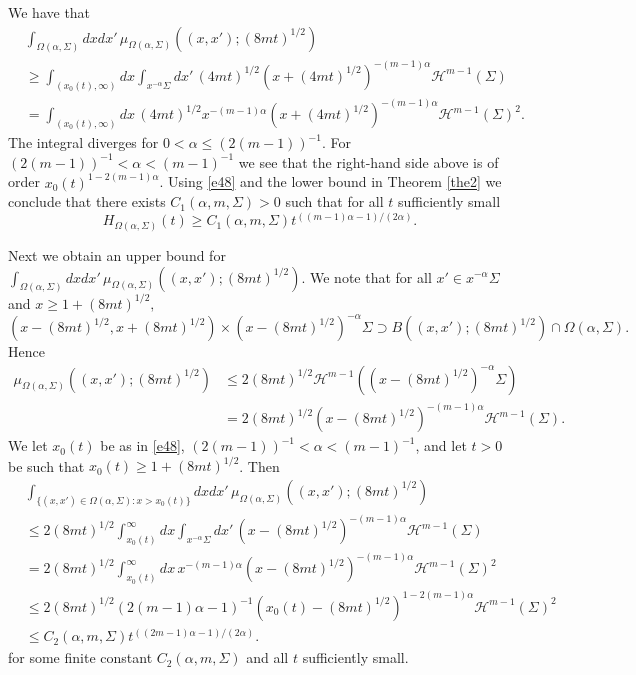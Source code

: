 \documentclass[a4paper,9pt]{amsart}
\begin{document}
We have that
\begin{align*}
&\int_{\Omega(\alpha,\Sigma)}dxdx' \,
\mu_{\Omega(\alpha,\Sigma)}((x,x');(8mt)^{1/2})
\\ &
\ge \int_{(x_0(t),\infty)}dx\int_{x^{-\alpha}\Sigma}
dx' \, (4mt)^{1/2}(x+(4mt)^{1/2})^{-(m-1)\alpha}\mathcal{H}^{m-1}(\Sigma)
\\ &
=\int_{(x_0(t),\infty)}dx \, (4mt)^{1/2}x^{-(m-1)\alpha}(x+(4mt)^{1/2})^{-(m-1)\alpha}\mathcal{H}^{m-1}(\Sigma)^2.
\end{align*}
The integral diverges for $0<\alpha\le (2(m-1))^{-1}$. For
$(2(m-1))^{-1}<\alpha<(m-1)^{-1}$ we see that the right-hand side
above is of order $x_0(t)^{1-2(m-1)\alpha}$. Using \eqref{e48} and
the lower bound in Theorem \ref{the2} we conclude that there
exists $C_1(\alpha,m,\Sigma)>0$ such that for all $t$ sufficiently
small
\begin{equation}\label{e521}
H_{\Omega(\alpha,\Sigma)}(t)\ge
C_1(\alpha,m,\Sigma)t^{((m-1)\alpha-1)/(2\alpha)}.
\end{equation}

Next we obtain an upper bound for
$\int_{\Omega(\alpha,\Sigma)}dxdx' \,
\mu_{\Omega(\alpha,\Sigma)}((x,x');(8mt)^{1/2})$. We note that for
all $x'\in x^{-\alpha}\Sigma$ and $x\ge 1+(8mt)^{1/2},$
\begin{equation*}
(x-(8mt)^{1/2},x+(8mt)^{1/2})\times(x-(8mt)^{1/2})^{-\alpha}\Sigma
\supset B((x,x');(8mt)^{1/2})\cap \Omega(\alpha,\Sigma).
\end{equation*}
Hence
\begin{align*}
\mu_{\Omega(\alpha,\Sigma)}((x,x');(8mt)^{1/2})&\le
2(8mt)^{1/2}\mathcal{H}^{m-1}((x-(8mt)^{1/2})^{-\alpha}\Sigma)\\
&=
2(8mt)^{1/2}(x-(8mt)^{1/2})^{-(m-1)\alpha}\mathcal{H}^{m-1}(\Sigma).
\end{align*}
We let $x_0(t)$ be as in \eqref{e48},
$(2(m-1))^{-1}<\alpha<(m-1)^{-1}$, and let $t>0$ be such that
$x_0(t)\ge 1+(8mt)^{1/2}$. Then
\begin{align}\label{e55}
&\int_{\{(x,x')\in \Omega(\alpha,\Sigma):x>x_0(t)\}}dxdx' \,
\mu_{\Omega(\alpha,\Sigma)}((x,x');(8mt)^{1/2})\nonumber
\\ &
\le2(8mt)^{1/2}\int_{x_0(t)}^{\infty}dx
\int_{x^{-\alpha}\Sigma}dx' \,
(x-(8mt)^{1/2})^{-(m-1)\alpha}\mathcal{H}^{m-1}(\Sigma)\nonumber
\\
&=2(8mt)^{1/2}\int_{x_0(t)}^{\infty}dx \, x^{-(m-1)\alpha}(x-(8mt)^{1/2})^{-(m-1)\alpha}\mathcal{H}^{m-1}(\Sigma)^2\nonumber
\\
&\le2(8mt)^{1/2}(2(m-1)\alpha-1)^{-1}(x_0(t)-(8mt)^{1/2})^{1-2(m-1)\alpha}\mathcal{H}^{m-1}(\Sigma)^2\nonumber
\\ & \le C_2(\alpha,m,\Sigma)t^{((2m-1)\alpha-1)/(2\alpha)}.
\end{align}
for some finite constant $C_2(\alpha,m,\Sigma)$ and all $t$
sufficiently small.
\end{document}
